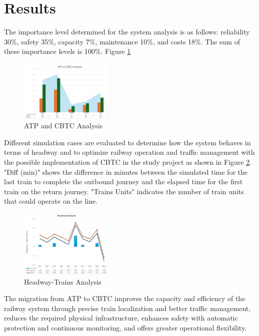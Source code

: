 \documentclass[conference]{IEEEtran}
\begin{document}
\section{Results}
The importance level determined for the system analysis is as follows: reliability 30\%, safety 35\%, capacity 7\%, maintenance 10\%, and costs 18\%. The sum of these importance levels is 100\%. Figure \ref{fig:Analysis}
\begin{figure}[h]
    \centering
\includegraphics[width=0.4\textwidth, scale=1]{Imagenes_general/Grahp_general.png}
    \caption{ ATP and CBTC Analysis}
    \label{fig:Analysis}
\end{figure}
Different simulation cases are evaluated to determine how the system behaves in terms of headway and to optimize railway operation and traffic management with the possible implementation of CBTC in the study project as shown in Figure \ref{fig:Headway-Trains Analysis}. "Diff (min)" shows the difference in minutes between the simulated time for the last train to complete the outbound journey and the elapsed time for the first train on the return journey. "Trains Units" indicates the number of train units that could operate on the line. 
\begin{figure}[htbp]
    \centering
\includegraphics[width=0.4\textwidth,scale=1]{Imagenes_general/Analysis_Headway.jpg}
    \caption{Headway-Trains Analysis}
    \label{fig:Headway-Trains Analysis}
\end{figure}
The migration from ATP to CBTC improves the capacity and efficiency of the railway system through precise train localization and better traffic management, reduces the required physical infrastructure, enhances safety with automatic protection and continuous monitoring, and offers greater operational flexibility.\\
\end{document}
